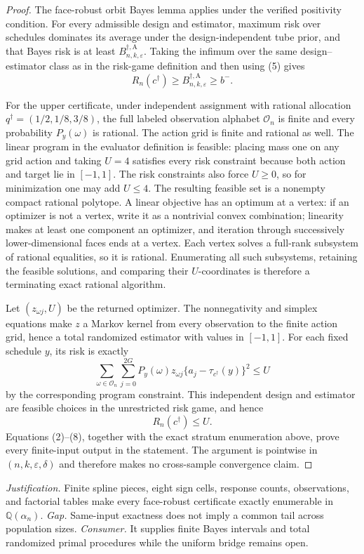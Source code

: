 \documentclass{article}
\begin{document}
{\begin{proof}
The face-robust orbit Bayes lemma applies under the verified positivity condition.
For every admissible design and estimator, maximum risk over schedules dominates
its average under the design-independent tube prior, and that Bayes risk is at
least \(B_{n,k,\varepsilon}^{\dagger,\mathrm A}\).  Taking the infimum over the
same design--estimator class as in the risk-game definition and then using (5)
gives
\[
 R_n(c^\dagger)
 \ge B_{n,k,\varepsilon}^{\dagger,\mathrm A}
 \ge b^-.
\tag{6}
\]

For the upper certificate, under independent assignment with rational allocation
\(q^\dagger=(1/2,1/8,3/8)\), the full labeled observation alphabet
\(\mathcal O_n\) is finite and every probability \(P_y(\omega)\) is rational.
The action grid is finite and rational as well.  The linear program in the evaluator
definition is feasible: placing mass one on any grid action and taking \(U=4\)
satisfies every risk constraint because both action and target lie in
\([-1,1]\).  The risk constraints also force \(U\ge0\), so for minimization one
may add \(U\le4\).  The resulting feasible set is a nonempty compact rational
polytope.  A linear objective has an optimum at a vertex: if an optimizer is not a
vertex, write it as a nontrivial convex combination; linearity makes at least one
component an optimizer, and iteration through successively lower-dimensional faces
ends at a vertex.  Each vertex solves a full-rank subsystem of rational equalities,
so it is rational.  Enumerating all such subsystems, retaining the feasible
solutions, and comparing their \(U\)-coordinates is therefore a terminating exact
rational algorithm.

Let \((z_{\omega j},U)\) be the returned optimizer.  The nonnegativity and
simplex equations make \(z\) a Markov kernel from every observation to the finite
action grid, hence a total randomized estimator with values in \([-1,1]\).  For
each fixed schedule \(y\), its risk is exactly
\[
 \sum_{\omega\in\mathcal O_n}\sum_{j=0}^{2G}
 P_y(\omega)z_{\omega j}
 \{a_j-\tau_{c^\dagger}(y)\}^2\le U
\tag{7}
\]
by the corresponding program constraint.  This independent design and estimator
are feasible choices in the unrestricted risk game, and hence
\[
 R_n(c^\dagger)\le U.
\tag{8}
\]
Equations (2)--(8), together with the exact stratum enumeration above, prove every
finite-input output in the statement.  The argument is pointwise in
\((n,k,\varepsilon,\delta)\) and therefore makes no cross-sample convergence
claim.
\end{proof}
\par\smallskip\noindent \textit{Justification.} Finite spline pieces, eight sign cells, response counts, observations, and factorial tables make every face-robust certificate exactly enumerable in \(\mathbb Q(\alpha_n)\). \textit{Gap.} Same-input exactness does not imply a common tail across population sizes. \textit{Consumer.} It supplies finite Bayes intervals and total randomized primal procedures while the uniform bridge remains open.

}
\end{document}
